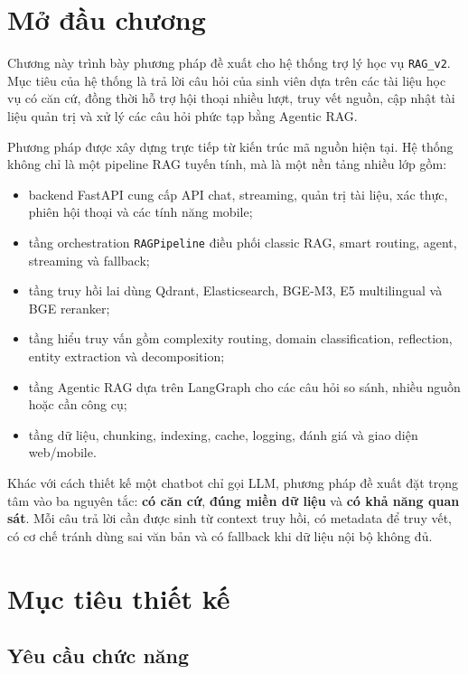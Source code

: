 \documentclass[../DoAn.tex]{subfiles}
\begin{document}
\section{Mở đầu chương}

Chương này trình bày phương pháp đề xuất cho hệ thống trợ lý học vụ
\texttt{RAG\_v2}. Mục tiêu của hệ thống là trả lời câu hỏi của sinh viên dựa
trên các tài liệu học vụ có căn cứ, đồng thời hỗ trợ hội thoại nhiều lượt, truy
vết nguồn, cập nhật tài liệu quản trị và xử lý các câu hỏi phức tạp bằng
Agentic RAG.

Phương pháp được xây dựng trực tiếp từ kiến trúc mã nguồn hiện tại. Hệ thống
không chỉ là một pipeline RAG tuyến tính, mà là một nền tảng nhiều lớp gồm:

\begin{itemize}
    \item backend FastAPI cung cấp API chat, streaming, quản trị tài liệu, xác
    thực, phiên hội thoại và các tính năng mobile;
    \item tầng orchestration \texttt{RAGPipeline} điều phối classic RAG, smart
    routing, agent, streaming và fallback;
    \item tầng truy hồi lai dùng Qdrant, Elasticsearch, BGE-M3, E5 multilingual
    và BGE reranker;
    \item tầng hiểu truy vấn gồm complexity routing, domain classification,
    reflection, entity extraction và decomposition;
    \item tầng Agentic RAG dựa trên LangGraph cho các câu hỏi so sánh, nhiều
    nguồn hoặc cần công cụ;
    \item tầng dữ liệu, chunking, indexing, cache, logging, đánh giá và giao
    diện web/mobile.
\end{itemize}

Khác với cách thiết kế một chatbot chỉ gọi LLM, phương pháp đề xuất đặt trọng
tâm vào ba nguyên tắc: \textbf{có căn cứ}, \textbf{đúng miền dữ liệu} và
\textbf{có khả năng quan sát}. Mỗi câu trả lời cần được sinh từ context truy hồi,
có metadata để truy vết, có cơ chế tránh dùng sai văn bản và có fallback khi dữ
liệu nội bộ không đủ.

\section{Mục tiêu thiết kế}

\subsection{Yêu cầu chức năng}
\end{document}
